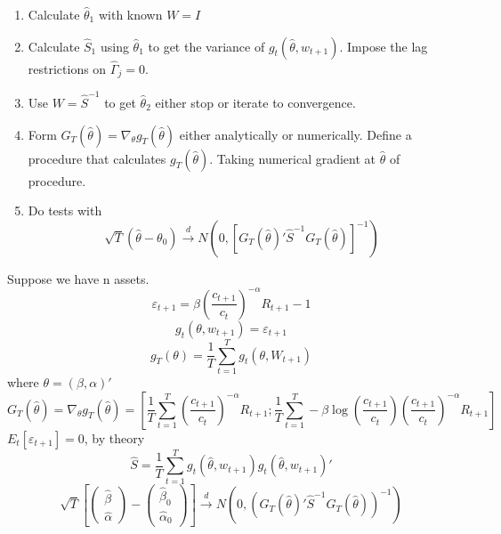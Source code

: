 \documentclass[11pt, a4paper, oneside]{article}
\theoremstyle{definition}
\theoremstyle{proposition}
\theoremstyle{corollary}
\theoremstyle{lemma}
\theoremstyle{theorem}
\begin{document}
\begin{enumerate}
\item Calculate $\hat{\theta}_1$ with known $W =I$
\item Calculate $\hat{S}_1$ using $\hat{\theta}_1$ to get the variance of $g_t(\hat{\theta}, w_{t+1})$. Impose the lag restrictions on $\hat{\Gamma}_j = 0$. 
\item Use $W = \hat{S}^{-1}$ to get $\hat{\theta}_2$ either stop or iterate to convergence. 
\item Form $G_T(\hat{\theta}) = \nabla_{\theta}g_T(\hat{\theta})$ either analytically or numerically. Define a procedure that calculates $g_T(\hat{\theta})$. Taking numerical gradient at $\hat{\theta}$ of procedure.
\item Do tests with $$\sqrt{T}(\hat{\theta}- \theta_0)\overset{d}{\to} N(0, \left[G_T(\hat{\theta})'\hat{S}^{-1}G_T(\hat{\theta})\right]^{-1})$$
\end{enumerate}
Suppose we have n assets.
$$\varepsilon_{t+1} = \beta\left(\frac{c_{t+1}}{c_t}\right)^{-\alpha} R_{t+1} - 1$$
$$g_t(\theta, w_{t +1}) = \varepsilon_{t+1}$$
$$g_T(\theta) = \frac{1}{T}\sum_{t=1}^T g_t(\theta, W_{t+1})$$
where $\theta = (\beta, \alpha)'$ 
$$G_T(\hat{\theta}) = \nabla_{\theta} g_T(\hat{\theta}) = \left[\frac{1}{T}\sum_{t=1}^T\left(\frac{c_{t+1}}{c_t}\right)^{-\alpha} R_{t+1}; \frac{1}{T}\sum_{t=1}^T-\beta\log\left(\frac{c_{t+1}}{c_t}\right)\left(\frac{c_{t+1}}{c_t}\right)^{-\alpha} R_{t+1}\right]$$
$E_t[\varepsilon_{t+1}] = 0$, by theory
$$\hat{S} = \frac{1}{T}\sum_{t=1}^T g_t(\hat{\theta}, w_{t+1})g_t(\hat{\theta}, w_{t+1})'$$
$$\sqrt{T}\left[\begin{pmatrix} \hat{\beta}\\\hat{\alpha}\end{pmatrix}- \begin{pmatrix} \hat{\beta}_0\\\hat{\alpha}_0\end{pmatrix}\right]\overset{d}{\to} N(0, (G_T(\hat{\theta})'\hat{S}^{-1}G_T(\hat{\theta}))^{-1})$$
\end{document}
